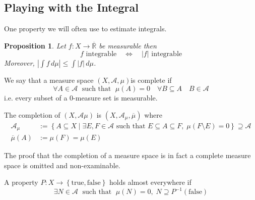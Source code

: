 \documentclass[11pt]{article}
\newcommand{\defeq}{:=}
\newcommand{\abs}[1]{|#1|}
\newcommand{\msrspc}{\ensuremath{(X,\mathcal{A},\mu)}}
\newcommand{\relmiddle}[1]{\mathrel{}\middle#1\mathrel{}}
\newcommand{\rmv}{\relmiddle|}
\newcommand{\dm}{\ensuremath{\,d\mu}}
\newcommand{\R}{\mathbb{R}}
\newcommand{\Rb}{\overline{\R}}
\newenvironment{defin}
	{\begin{mdframed}[backgroundcolor=white, roundcorner=5pt, linewidth=1pt]}
	{\end{mdframed}}
\newcommand{\mdf}[1]{{\color{red} #1}}
\newtheorem{prop}[theorem]{Proposition}
\begin{document}
\subsection{Playing with the Integral}
One property we will often use to estimate integrals.
\begin{prop}
Let $f:X\to\Rb$ be measurable then
\[
	f\text{ integrable}\quad\iff\quad\abs{f}\text{ integrable}
\]
Moreover, $\abs{\int f \dm} \leq \int \abs{f} \dm$.
\end{prop}
\begin{defin}
	We say that a measure space \msrspc is \mdf{complete} if 
\[
	\forall A \in \mathcal{A}\;\text{ such that }\;\mu(A) = 0\quad \forall B\subseteq A\quad B\in\mathcal{A}
\]
i.e. every subset of a $0$-measure set is measurable.

The \mdf{completion} of $(X, \mathcal{A}\mu)$ is $(X, \mathcal{A}_\mu , \overline{\mu})$ where
\begin{align*}
	\mathcal{A}_\mu & \defeq \left\{A \subseteq X \rmv \exists E,F\in\mathcal{A}\text{ such that }E\subseteq A \subseteq F,\;\mu(F\setminus E)=0\right\}\supseteq \mathcal{A}\\
	\overline{\mu}(A) & \defeq \mu(F) = \mu(E)
\end{align*}
\end{defin}
The proof that the completion of a measure space is in fact a complete measure space is omitted and non-examinable.
\begin{defin}
	A property $P:X\to\left\{\text{true}, \text{false}\right\}$ holds \mdf{almost everywhere} if 
	\[
		\exists N\in \mathcal{A}\;\text{ such that }\;\mu(N)=0,\;N\supseteq P^{-1}(\text{false})
	\]
\end{defin}
\end{document}
